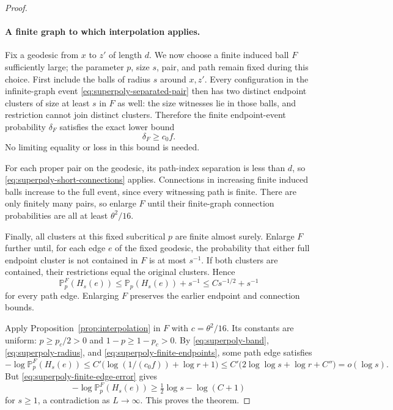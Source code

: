 \documentclass[11pt]{article}
\theoremstyle{definition}
\begin{document}
\begin{proof}
\paragraph{A finite graph to which interpolation applies.}
Fix a geodesic from $x$ to $z'$ of length $d$. We now choose a finite
induced ball $F$ sufficiently large; the parameter $p$, size $s$,
pair, and path remain fixed during this choice.
First include the balls of radius $s$ around $x,z'$. Every configuration
in the infinite-graph event \eqref{eq:superpoly-separated-pair} then
has two distinct endpoint clusters of size at least $s$ in $F$ as
well: the size witnesses lie in those balls, and restriction cannot
join distinct clusters. Therefore the finite endpoint-event probability
$\delta_F$ satisfies the exact lower bound
\begin{equation}\label{eq:superpoly-finite-endpoints}
 \delta_F\ge c_0f.
\end{equation}
No limiting equality or loss in this bound is needed.

For each proper pair on the geodesic, its path-index separation is
less than $d$, so \eqref{eq:superpoly-short-connections} applies.
Connections in increasing finite induced balls increase to the full
event, since every witnessing path is finite. There are only finitely
many pairs, so enlarge $F$ until their finite-graph connection
probabilities are all at least $\theta^2/16$.

Finally, all clusters at this fixed subcritical $p$ are finite almost
surely. Enlarge $F$ further until, for each edge $e$ of the fixed
geodesic, the probability that either full endpoint cluster is not
contained in $F$ is at most $s^{-1}$. If both clusters are contained,
their restrictions equal the original clusters. Hence
\begin{equation}\label{eq:superpoly-finite-edge-error}
 \mathbb P_p^F(H_s(e))
 \le\mathbb P_p(H_s(e))+s^{-1}
 \le Cs^{-1/2}+s^{-1}
\end{equation}
for every path edge. Enlarging $F$ preserves the earlier endpoint
and connection bounds.

Apply Proposition~\ref{prop:interpolation} in $F$ with
$c=\theta^2/16$. Its constants are uniform: $p\ge p_c/2>0$ and
$1-p\ge1-p_c>0$. By \eqref{eq:superpoly-band},
\eqref{eq:superpoly-radius}, and
\eqref{eq:superpoly-finite-endpoints}, some path edge satisfies
\[
 -\log\mathbb P_p^F(H_s(e))
 \le C'\bigl(\log(1/(c_0f))+\log r+1\bigr)
 \le C'\bigl(2\log\log s+\log r+C''\bigr)
 =o(\log s).
\]
But \eqref{eq:superpoly-finite-edge-error} gives
\[
 -\log\mathbb P_p^F(H_s(e))
 \ge\tfrac12\log s-\log(C+1)
\]
for $s\ge1$, a contradiction as $L\to\infty$.
This proves the theorem.
\end{proof}
\end{document}
